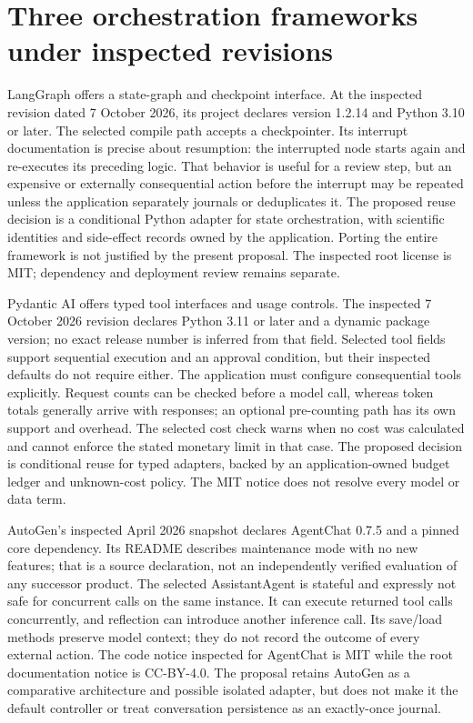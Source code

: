 \section{Three orchestration frameworks under inspected revisions}

LangGraph offers a state-graph and checkpoint interface. At the inspected
revision dated 7 October 2026, its project declares version 1.2.14 and Python
3.10 or later. The selected compile path accepts a checkpointer. Its interrupt
documentation is precise about resumption: the interrupted node starts again
and re-executes its preceding logic. That behavior is useful for a review
step, but an expensive or externally consequential action before the
interrupt may be repeated unless the application separately journals or
deduplicates it. The proposed reuse decision is a conditional Python
adapter for state orchestration, with scientific identities and side-effect
records owned by the application. Porting the entire framework is not
justified by the present proposal. The inspected root license is MIT;
dependency and deployment review remains separate.\cite{v12_la04_langgraph}

Pydantic AI offers typed tool interfaces and usage controls. The inspected
7 October 2026 revision declares Python 3.11 or later and a dynamic package
version; no exact release number is inferred from that field. Selected tool
fields support sequential execution and an approval condition, but their
inspected defaults do not require either. The application must configure
consequential tools explicitly. Request counts can be checked before a model
call, whereas token totals generally arrive with responses; an optional
pre-counting path has its own support and overhead. The selected cost check
warns when no cost was calculated and cannot enforce the stated monetary
limit in that case. The proposed decision is conditional reuse for typed
adapters, backed by an application-owned budget ledger and unknown-cost
policy. The MIT notice does not resolve every model or data term.
\cite{v12_la04_pydantic_ai}

AutoGen's inspected April 2026 snapshot declares AgentChat 0.7.5 and a pinned
core dependency. Its README describes maintenance mode with no new features;
that is a source declaration, not an independently verified evaluation of
any successor product. The selected AssistantAgent is stateful and expressly
not safe for concurrent calls on the same instance. It can execute returned
tool calls concurrently, and reflection can introduce another inference
call. Its save/load methods preserve model context; they do not record the
outcome of every external action. The code notice inspected for AgentChat
is MIT while the root documentation notice is CC-BY-4.0. The proposal retains
AutoGen as a comparative architecture and possible isolated adapter, but
does not make it the default controller or treat conversation persistence
as an exactly-once journal.\cite{v12_la04_autogen}

